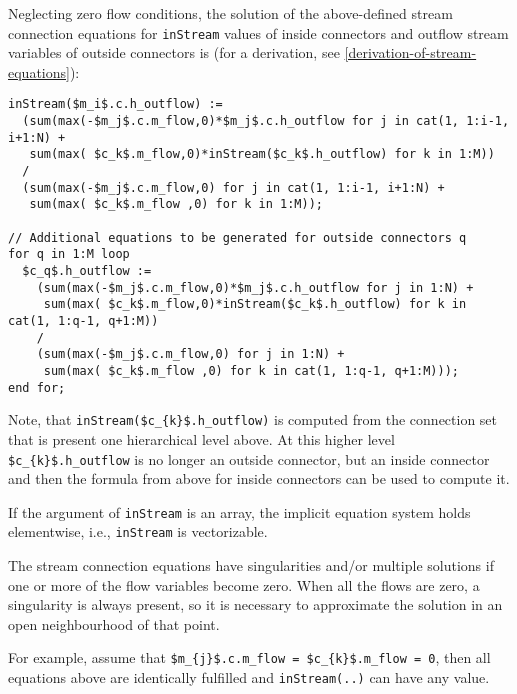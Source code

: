Neglecting zero flow conditions, the solution of the above-defined
stream connection equations for \lstinline!inStream! values of inside connectors and
outflow stream variables of outside connectors is (for a derivation, see
\autoref{derivation-of-stream-equations}):
\begin{lstlisting}[language=modelica,mathescape=true]
inStream($m_i$.c.h_outflow) :=
  (sum(max(-$m_j$.c.m_flow,0)*$m_j$.c.h_outflow for j in cat(1, 1:i-1, i+1:N) +
   sum(max( $c_k$.m_flow,0)*inStream($c_k$.h_outflow) for k in 1:M))
  /
  (sum(max(-$m_j$.c.m_flow,0) for j in cat(1, 1:i-1, i+1:N) +
   sum(max( $c_k$.m_flow ,0) for k in 1:M));

// Additional equations to be generated for outside connectors q
for q in 1:M loop
  $c_q$.h_outflow :=
    (sum(max(-$m_j$.c.m_flow,0)*$m_j$.c.h_outflow for j in 1:N) +
     sum(max( $c_k$.m_flow,0)*inStream($c_k$.h_outflow) for k in cat(1, 1:q-1, q+1:M))
    /
    (sum(max(-$m_j$.c.m_flow,0) for j in 1:N) +
     sum(max( $c_k$.m_flow ,0) for k in cat(1, 1:q-1, q+1:M)));
end for;
\end{lstlisting}

\begin{nonnormative}
Note, that \lstinline[mathescape=true]!inStream($c_{k}$.h_outflow)! is computed from the connection set that is present one hierarchical level above.  At this higher level
\lstinline[mathescape=true]!$c_{k}$.h_outflow! is no longer an outside connector, but an inside connector and then the formula from above for inside connectors can be used
to compute it.
\end{nonnormative}

If the argument of \lstinline!inStream! is an array, the implicit
equation system holds elementwise, i.e., \lstinline!inStream! is
vectorizable.

The stream connection equations have singularities and/or multiple
solutions if one or more of the flow variables become zero. When all the
flows are zero, a singularity is always present, so it is necessary to
approximate the solution in an open neighbourhood of that point.

\begin{nonnormative}
For example, assume that \lstinline[mathescape=true]!$m_{j}$.c.m_flow = $c_{k}$.m_flow = 0!, then all equations above are identically fulfilled and \lstinline!inStream(..)! can have any value.
\end{nonnormative}

